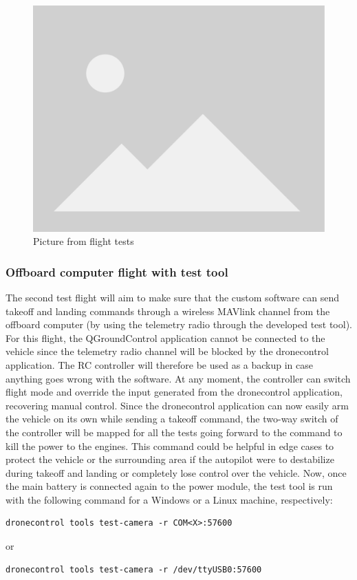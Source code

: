 
\begin{figure}
  \centering
  \includegraphics[width=.6\textwidth, keepaspectratio]{img/placeholder.png}
  \caption{Picture from flight tests}
  \label{fig:flight-test-basic}
\end{figure}

\subsubsection{Offboard computer flight with test tool}
\label{subsec:fl-test-2}

The second test flight will aim to make sure that the custom software can send takeoff and landing commands through a wireless MAVlink channel from the offboard computer (by using the telemetry radio through the developed test tool).
For this flight, the QGroundControl application cannot be connected to the vehicle since the telemetry radio channel will be blocked by the dronecontrol application.
The RC controller will therefore be used as a backup in case anything goes wrong with the software.
At any moment, the controller can switch flight mode and override the input generated from the dronecontrol application, recovering manual control.
Since the dronecontrol application can now easily arm the vehicle on its own while sending a takeoff command,
the two-way switch of the controller will be mapped for all the tests going forward to the command to kill the power to the engines.
This command could be helpful in edge cases to protect the vehicle or the surrounding area if the autopilot were to destabilize during takeoff and landing or completely lose control over the vehicle.
Now, once the main battery is connected again to the power module, the test tool is run with the following command for a Windows or a Linux machine, respectively:
\begin{verbatim}
dronecontrol tools test-camera -r COM<X>:57600
\end{verbatim}
or
\begin{verbatim}
dronecontrol tools test-camera -r /dev/ttyUSB0:57600
\end{verbatim}

